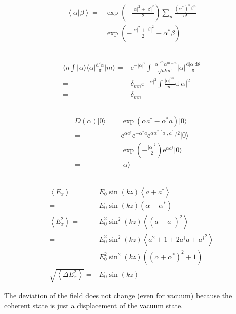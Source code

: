\documentclass[10pt,fleqn]{article}
\newcommand{\ud}{\mathrm{d}}
\newcommand{\ue}{\mathrm{e}}
\newcommand{\eqar}[1]
{
  \begin{align*}
    #1
  \end{align*}
}
\newcommand{\paren}[1]{{\left({#1}\right)}}
\newcommand{\abs}[1]{{\left|{#1}\right|}}
\newcommand{\sqr}[1]{{\left[{#1}\right]}}
\newcommand{\angl}[1]{{\left\langle{#1}\right\rangle}}
\begin{document}
\section{}
\subsection{}
\eqar{
  \angl{\alpha|\beta}=&\exp\paren{-\frac{\abs{\alpha}^2+\abs{\beta}^2}2}
  \sum_{n}\frac{(\alpha^*)^n\beta^n}{n!}\\
  =&\exp\paren{-\frac{\abs{\alpha}^2+\abs{\beta}^2}2+\alpha^*\beta}
}
\subsection{}
\eqar{
  \langle n\int |\alpha\rangle\langle\alpha|\frac{\ud^2\alpha}{\pi}|m\rangle=&\ue^{-\abs{\alpha}^2}\int \frac{\abs{\alpha}^{2n}\alpha^{m-n}}{\sqrt{n!m!}}\abs{\alpha}\frac{\ud\abs{\alpha}\ud\theta}{\pi}\\
  =&\delta_{mn}\ue^{-\abs{\alpha}^2}\int \frac{\abs{\alpha}^{2n}}{n!}\ud\abs{\alpha}^2\\
  =&\delta_{mn}
}
\subsection{}
\eqar{
  D\paren{\alpha}|0\rangle=&\exp\paren{\alpha a^\dagger-\alpha^*a}|0\rangle\\
  =&\ue^{\alpha a^\dagger}\ue^{-\alpha^*a}\ue^{\alpha\alpha^*\sqr{a^\dagger, a} / 2}|0\rangle\\
  =&\exp\paren{-\frac{\abs{\alpha}^2}2}\ue^{\alpha a^\dagger}|0\rangle\\
  =&|\alpha\rangle
}
\subsection{}
\eqar{
  \angl{E_x}=&E_0\sin\paren{kz}\angl{a + a^\dagger}\\
  =&E_0\sin\paren{kz}\paren{\alpha + \alpha^*}\\
  \angl{E_x^2}=&E_0^2\sin^2\paren{kz}\angl{\paren{a + a^\dagger}^2}\\
  =&E_0^2\sin^2\paren{kz}\angl{a^2 + 1 + 2a^\dagger a+{a^\dagger}^2}\\
  =&E_0^2\sin^2\paren{kz}\paren{\paren{\alpha + \alpha^*}^2 + 1}\\
  \sqrt{\angl{\Delta E_x^2}}=&E_0\sin\paren{kz}
}
The deviation of the field does not change (even for vacuum) because the coherent state is just a displacement of the vacuum state.
\end{document}
